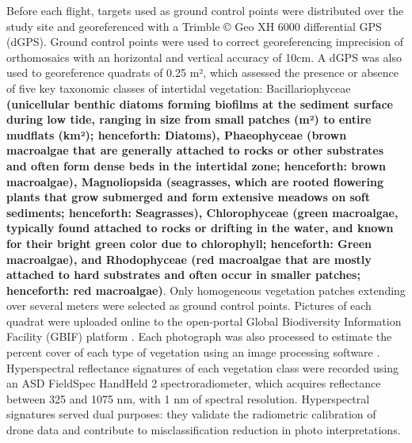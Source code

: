 \documentclass[
  number]{elsarticle}
\begin{document}
Before each flight, targets used as ground control points were
distributed over the study site and georeferenced with a Trimble © Geo
XH 6000 differential GPS (dGPS). Ground control points were used to
correct georeferencing imprecision of orthomosaics with an horizontal
and vertical accuracy of 10cm. A dGPS was also used to georeference
quadrats of 0.25 m², which assessed the presence or absence of five key
taxonomic classes of intertidal vegetation: Bacillariophyceae
\textbf{(unicellular benthic diatoms forming biofilms at the sediment
surface during low tide, ranging in size from small patches (m²) to
entire mudflats (km²); henceforth: Diatoms), Phaeophyceae (brown
macroalgae that are generally attached to rocks or other substrates and
often form dense beds in the intertidal zone; henceforth: brown
macroalgae), Magnoliopsida (seagrasses, which are rooted flowering
plants that grow submerged and form extensive meadows on soft sediments;
henceforth: Seagrasses), Chlorophyceae (green macroalgae, typically
found attached to rocks or drifting in the water, and known for their
bright green color due to chlorophyll; henceforth: Green macroalgae),
and Rhodophyceae (red macroalgae that are mostly attached to hard
substrates and often occur in smaller patches; henceforth: red
macroalgae)}. Only homogeneous vegetation patches extending over several
meters were selected as ground control points. Pictures of each quadrat
were uploaded online to the open-portal Global Biodiversity Information
Facility (GBIF) platform \citep{BedeGbif}. Each photograph was also
processed to estimate the percent cover of each type of vegetation using
an image processing software \citep[ImageJ,][]{schneider2012nih}.
Hyperspectral reflectance signatures of each vegetation class were
recorded using an ASD FieldSpec HandHeld 2 spectroradiometer, which
acquires reflectance between 325 and 1075 nm, with 1 nm of spectral
resolution. Hyperspectral signatures served dual purposes: they validate
the radiometric calibration of drone data and contribute to
misclassification reduction in photo interpretations.
\end{document}
